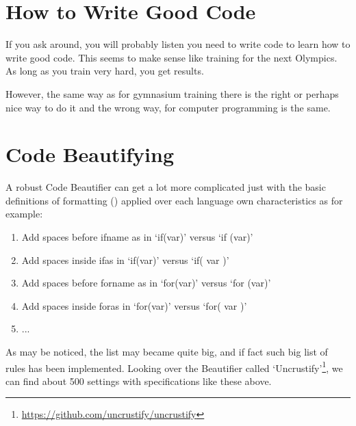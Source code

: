     \section{How to Write Good Code}

    If you ask around, you will probably listen you need to write code to learn
    how to write good code. This seems to make sense like training for the next
    Olympics. As long as you train very hard, you get results.

    However, the same way as for gymnasium training there is the right or
    perhaps nice way to do it and the wrong way, for computer programming is the
    same.



    \section{Code Beautifying}

    A robust Code Beautifier can get a lot more complicated just with the basic
    definitions of formatting ()
    applied over each language own characteristics
    as for example:

    \begin{enumerate}
        \item Add spaces before if\s name as in `if(var)' versus `if (var)'
        \item Add spaces inside if\s as in `if(var)' versus `if( var )'
        \item Add spaces before for\s name as in `for(var)' versus `for (var)'
        \item Add spaces inside for\s as in `for(var)' versus `for( var )'
        \item ...
    \end{enumerate}

    As may be noticed, the list may became quite big, and if fact such big list
    of rules has been implemented.
    Looking over the Beautifier called `Uncrustify'\footnote{\url{https://github.com/uncrustify/uncrustify}},
    we can find about 500 settings with specifications like these above.



